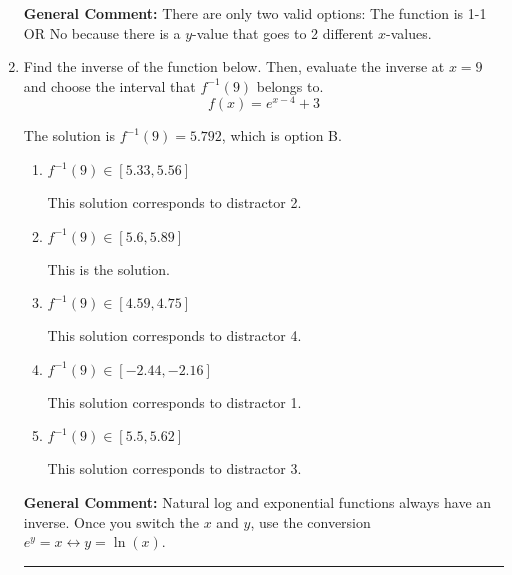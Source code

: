 \documentclass{extbook}[14pt]
\newcommand{\litem}[1]{\item #1

\rule{\textwidth}{0.4pt}}
\begin{document}
\begin{enumerate}
{\textbf{General Comment:} There are only two valid options: The function is 1-1 OR No because there is a $y$-value that goes to 2 different $x$-values.
}
\litem{
Find the inverse of the function below. Then, evaluate the inverse at $x = 9$ and choose the interval that $f^{-1}(9)$ belongs to.
\[ f(x) = e^{x-4}+3 \]

The solution is \( f^{-1}(9) = 5.792 \), which is option B.\begin{enumerate}[label=\Alph*.]
\item \( f^{-1}(9) \in [5.33, 5.56] \)

 This solution corresponds to distractor 2.
\item \( f^{-1}(9) \in [5.6, 5.89] \)

 This is the solution.
\item \( f^{-1}(9) \in [4.59, 4.75] \)

 This solution corresponds to distractor 4.
\item \( f^{-1}(9) \in [-2.44, -2.16] \)

 This solution corresponds to distractor 1.
\item \( f^{-1}(9) \in [5.5, 5.62] \)

 This solution corresponds to distractor 3.
\end{enumerate}

\textbf{General Comment:} Natural log and exponential functions always have an inverse. Once you switch the $x$ and $y$, use the conversion $ e^y = x \leftrightarrow y=\ln(x)$.
}
\end{enumerate}
\end{document}
